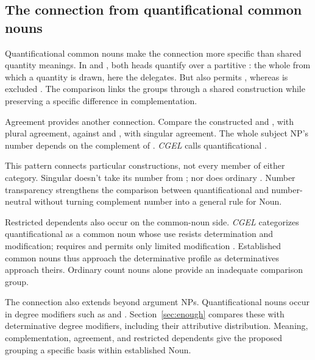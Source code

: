 \documentclass[12pt]{article}
\begin{document}
\subsection{The connection from quantificational common nouns}\label{sec:quant-nouns}

Quantificational common nouns make the connection more specific than shared quantity meanings. In  and , both heads quantify over a partitive : the whole from which a quantity is drawn, here the delegates. But  also permits , whereas  is excluded \citep[349]{huddleston2002}. The comparison links the groups through a shared construction while preserving a specific difference in complementation.

Agreement provides another connection. Compare the constructed  and , with plural agreement, against  and , with singular agreement. The whole subject NP's number depends on the complement of . \textit{CGEL} calls quantificational   \citep[349--350, 411--412]{huddleston2002}.

This pattern connects particular constructions, not every member of either category. Singular  doesn't take its number from ; nor does ordinary . Number transparency strengthens the comparison between quantificational  and number-neutral  without turning complement number into a general rule for Noun.

Restricted dependents also occur on the common-noun side. \textit{CGEL} categorizes quantificational  as a common noun whose use resists determination and modification;  requires  and permits only limited modification \citep[349--350]{huddleston2002}. Established common nouns thus approach the determinative profile as determinatives approach theirs. Ordinary count nouns alone provide an inadequate comparison group.

The connection also extends beyond argument NPs. Quantificational nouns occur in degree modifiers such as  and  \citep[549--550]{huddleston2002}. Section~\ref{sec:enough} compares these with determinative degree modifiers, including their attributive distribution. Meaning, complementation, agreement, and restricted dependents give the proposed grouping a specific basis within established Noun.
\end{document}
